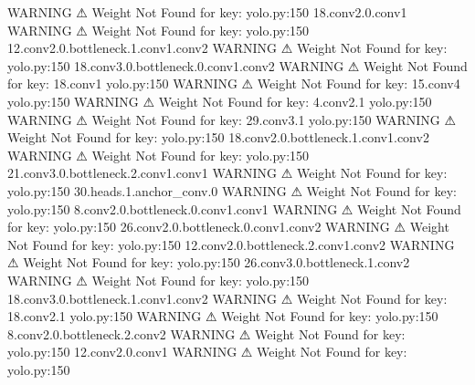                     WARNING  ⚠ Weight Not Found for key:               yolo.py:150
                             18.conv2.0.conv1                                     
                    WARNING  ⚠ Weight Not Found for key:               yolo.py:150
                             12.conv2.0.bottleneck.1.conv1.conv2                  
                    WARNING  ⚠ Weight Not Found for key:               yolo.py:150
                             18.conv3.0.bottleneck.0.conv1.conv2                  
                    WARNING  ⚠ Weight Not Found for key: 18.conv1      yolo.py:150
                    WARNING  ⚠ Weight Not Found for key: 15.conv4      yolo.py:150
                    WARNING  ⚠ Weight Not Found for key: 4.conv2.1     yolo.py:150
                    WARNING  ⚠ Weight Not Found for key: 29.conv3.1    yolo.py:150
                    WARNING  ⚠ Weight Not Found for key:               yolo.py:150
                             18.conv2.0.bottleneck.1.conv1.conv2                  
                    WARNING  ⚠ Weight Not Found for key:               yolo.py:150
                             21.conv3.0.bottleneck.2.conv1.conv1                  
                    WARNING  ⚠ Weight Not Found for key:               yolo.py:150
                             30.heads.1.anchor_conv.0                             
                    WARNING  ⚠ Weight Not Found for key:               yolo.py:150
                             8.conv2.0.bottleneck.0.conv1.conv1                   
                    WARNING  ⚠ Weight Not Found for key:               yolo.py:150
                             26.conv2.0.bottleneck.0.conv1.conv2                  
                    WARNING  ⚠ Weight Not Found for key:               yolo.py:150
                             12.conv2.0.bottleneck.2.conv1.conv2                  
                    WARNING  ⚠ Weight Not Found for key:               yolo.py:150
                             26.conv3.0.bottleneck.1.conv2                        
                    WARNING  ⚠ Weight Not Found for key:               yolo.py:150
                             18.conv3.0.bottleneck.1.conv1.conv2                  
                    WARNING  ⚠ Weight Not Found for key: 18.conv2.1    yolo.py:150
                    WARNING  ⚠ Weight Not Found for key:               yolo.py:150
                             8.conv2.0.bottleneck.2.conv2                         
                    WARNING  ⚠ Weight Not Found for key:               yolo.py:150
                             12.conv2.0.conv1                                     
                    WARNING  ⚠ Weight Not Found for key:               yolo.py:150
